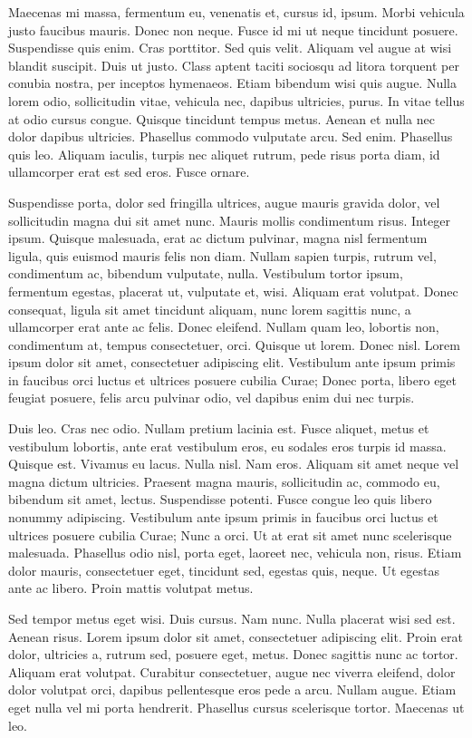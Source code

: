\documentclass{article}
\begin{document}
Maecenas mi massa, fermentum eu, venenatis et, cursus id, ipsum. Morbi
vehicula justo faucibus mauris. Donec non neque. Fusce id mi ut neque tincidunt
posuere. Suspendisse quis enim. Cras porttitor. Sed quis velit. Aliquam vel
augue at wisi blandit suscipit. Duis ut justo. Class aptent taciti sociosqu ad
litora torquent per conubia nostra, per inceptos hymenaeos. Etiam bibendum wisi
quis augue. Nulla lorem odio, sollicitudin vitae, vehicula nec, dapibus
ultricies, purus. In vitae tellus at odio cursus congue. Quisque tincidunt
tempus metus. Aenean et nulla nec dolor dapibus ultricies. Phasellus commodo
vulputate arcu. Sed enim. Phasellus quis leo. Aliquam iaculis, turpis nec
aliquet rutrum, pede risus porta diam, id ullamcorper erat est sed eros. Fusce
ornare.

Suspendisse porta, dolor sed fringilla ultrices, augue mauris gravida
dolor, vel sollicitudin magna dui sit amet nunc. Mauris mollis condimentum
risus. Integer ipsum. Quisque malesuada, erat ac dictum pulvinar, magna nisl
fermentum ligula, quis euismod mauris felis non diam. Nullam sapien turpis,
rutrum vel, condimentum ac, bibendum vulputate, nulla. Vestibulum tortor ipsum,
fermentum egestas, placerat ut, vulputate et, wisi. Aliquam erat volutpat.
Donec consequat, ligula sit amet tincidunt aliquam, nunc lorem sagittis nunc, a
ullamcorper erat ante ac felis. Donec eleifend. Nullam quam leo, lobortis non,
condimentum at, tempus consectetuer, orci. Quisque ut lorem. Donec nisl.
Lorem ipsum dolor sit amet, consectetuer adipiscing elit. Vestibulum ante ipsum
primis in faucibus orci luctus et ultrices posuere cubilia Curae; Donec porta,
libero eget feugiat posuere, felis arcu pulvinar odio, vel dapibus enim dui nec
turpis.

Duis leo. Cras nec odio. Nullam pretium lacinia est. Fusce aliquet, metus
et vestibulum lobortis, ante erat vestibulum eros, eu sodales eros turpis id
massa. Quisque est. Vivamus eu lacus. Nulla nisl. Nam eros. Aliquam sit amet
neque vel magna dictum ultricies. Praesent magna mauris, sollicitudin ac,
commodo eu, bibendum sit amet, lectus. Suspendisse potenti. Fusce congue leo
quis libero nonummy adipiscing. Vestibulum ante ipsum primis in faucibus orci
luctus et ultrices posuere cubilia Curae; Nunc a orci. Ut at erat sit amet nunc
scelerisque malesuada. Phasellus odio nisl, porta eget, laoreet nec, vehicula
non, risus. Etiam dolor mauris, consectetuer eget, tincidunt sed, egestas quis,
neque. Ut egestas ante ac libero. Proin mattis volutpat metus.

Sed tempor metus eget wisi. Duis cursus. Nam nunc. Nulla placerat wisi sed
est. Aenean risus. Lorem ipsum dolor sit amet, consectetuer adipiscing elit.
Proin erat dolor, ultricies a, rutrum sed, posuere eget, metus. Donec sagittis
nunc ac tortor. Aliquam erat volutpat. Curabitur consectetuer, augue nec
viverra eleifend, dolor dolor volutpat orci, dapibus pellentesque eros pede a
arcu. Nullam augue. Etiam eget nulla vel mi porta hendrerit. Phasellus cursus
scelerisque tortor. Maecenas ut leo.
\end{document}

